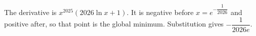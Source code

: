 The derivative is $x^{2025}(2026\ln x+1)$. It is negative before $x = e^{- \dfrac{1}{2026}}$ and positive after, so that point is the global minimum. Substitution gives $\boxed{-\dfrac{1}{2026e}}$.
